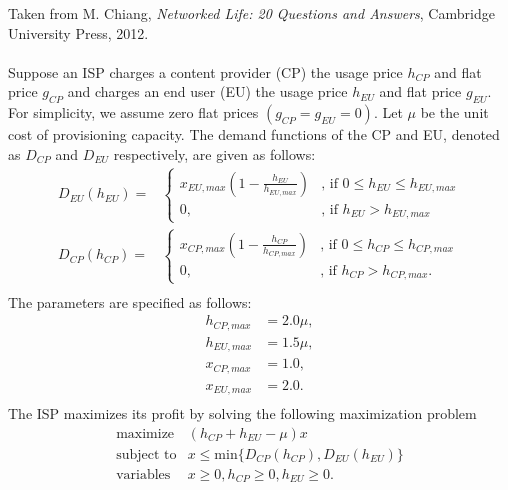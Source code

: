 \begin{enumerate}
Taken from M. Chiang, \emph{Networked Life: 20 Questions and Answers}, Cambridge University Press, 2012.
\\ \\
Suppose an ISP charges a content provider (CP) the usage price $h_{CP}$ and flat price $g_{CP}$ and charges an end user (EU) the usage price $h_{EU}$ and flat price $g_{EU}$. For simplicity, we assume zero flat prices $\left(g_{CP}=g_{EU}=0\right)$. Let $\mu$ be the unit cost of provisioning capacity. The demand functions of the CP and EU, denoted as $D_{CP}$ and $D_{EU}$ respectively, are given as follows:\\
\begin{subequations}
\begin{align*}
D_{EU}(h_{EU})=&\left\{
\begin{array}{ll}
x_{EU,max}(1-\frac{h_{EU}}{h_{EU,max}})&\mbox{, if } 0\leq h_{EU}\leq h_{EU,max}\\
0,&\mbox{, if } h_{EU}>h_{EU,max}
\end{array}\right.\\
D_{CP}(h_{CP})=&\left\{
\begin{array}{ll}
x_{CP,max}(1-\frac{h_{CP}}{h_{CP,max}})&\mbox{, if } 0\leq h_{CP}\leq h_{CP,max}\\
0,&\mbox{, if } h_{CP}>h_{CP,max}.
\end{array}\right.\\
\end{align*}
\end{subequations}
The parameters are specified as follows:
\begin{subequations}
\begin{align*}
h_{CP,max}&=2.0\mu,\\
h_{EU,max}&=1.5\mu,\\
x_{CP,max}&=1.0,\\
x_{EU,max}&=2.0.\\
\end{align*}
\end{subequations}
The ISP maximizes its profit by solving the following maximization problem
\begin{equation}
\begin{array}{ll}
\mbox{maximize}	&(h_{CP}+h_{EU}-\mu)x\\
\mbox{subject to}	&x\leq \mbox{min}\{D_{CP}(h_{CP}),D_{EU}(h_{EU})\}\\
\mbox{variables} 	&x\geq 0, h_{CP}\geq 0, h_{EU}\geq 0.
\end{array}
\end{equation}


\end{enumerate}
